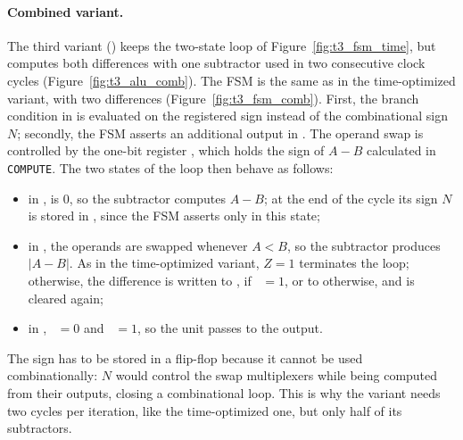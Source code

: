 \paragraph{Combined variant.}

The third variant () keeps the two-state loop of Figure~\ref{fig:t3_fsm_time}, but computes both differences with one subtractor used in two consecutive clock cycles (Figure~\ref{fig:t3_alu_comb}). The FSM is the same as in the time-optimized variant, with two differences (Figure~\ref{fig:t3_fsm_comb}). First, the branch condition in  is evaluated on the registered sign  instead of the combinational sign $N$; secondly, the FSM asserts an additional output  in . The operand swap is controlled by the one-bit register , which holds the sign of $A-B$ calculated in \texttt{COMPUTE}. The two states of the loop then behave as follows:
\begin{itemize}
    \item in ,  is 0, so the subtractor computes $A-B$; at the end of the cycle its sign $N$ is stored in , since the FSM asserts  only in this state;
    \item in , the operands are swapped whenever $A<B$, so the subtractor produces $|A-B|$. As in the time-optimized variant, $Z=1$ terminates the loop; otherwise, the difference is written to , if ~$=1$, or to  otherwise, and  is cleared again;
    \item in , ~$=0$ and ~$=1$, so the unit passes  to the output.
\end{itemize}
The sign has to be stored in a flip-flop because it cannot be used combinationally: $N$ would control the swap multiplexers while being computed from their outputs, closing a combinational loop. This is why the variant needs two cycles per iteration, like the time-optimized one, but only half of its subtractors.




